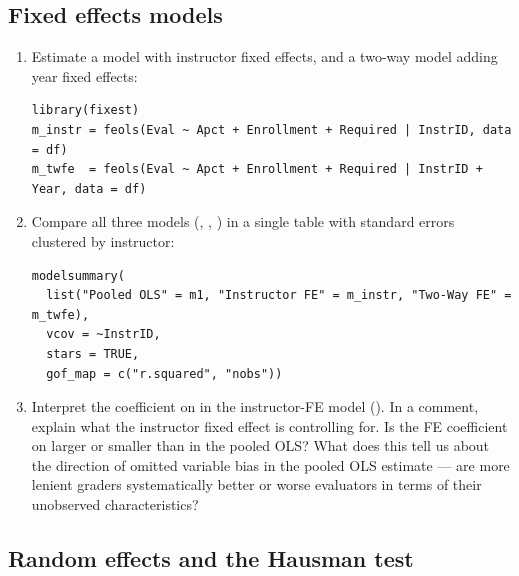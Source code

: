 \subsection{Fixed effects models}

\begin{enumerate}[label=\alph*)]
  \item Estimate a model with instructor fixed effects, and a two-way model adding year fixed effects:
  \begin{lstlisting}
library(fixest)
m_instr = feols(Eval ~ Apct + Enrollment + Required | InstrID, data = df)
m_twfe  = feols(Eval ~ Apct + Enrollment + Required | InstrID + Year, data = df)
  \end{lstlisting}
  \item Compare all three models (, , ) in a single table with standard errors clustered by instructor:
  \begin{lstlisting}
modelsummary(
  list("Pooled OLS" = m1, "Instructor FE" = m_instr, "Two-Way FE" = m_twfe),
  vcov = ~InstrID,
  stars = TRUE,
  gof_map = c("r.squared", "nobs"))
  \end{lstlisting}
  \item Interpret the coefficient on  in the instructor-FE model (). In a comment, explain what the instructor fixed effect is controlling for. Is the FE coefficient on  larger or smaller than in the pooled OLS? What does this tell us about the direction of omitted variable bias in the pooled OLS estimate --- are more lenient graders systematically better or worse evaluators in terms of their unobserved characteristics?
\end{enumerate}

\subsection{Random effects and the Hausman test}

